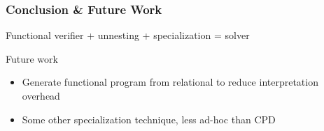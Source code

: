 \documentclass[xcolor=table]{beamer}
\begin{document}
\begin{frame}[fragile]
  \transwipe[direction=90]
  \frametitle{Conclusion \& Future Work}
\begin{center}
Functional verifier + unnesting + specialization = solver
\end{center}

\vspace{15pt}

Future work

\begin{itemize}
  \item Generate functional program from relational to reduce interpretation overhead
  \item Some other specialization technique, less ad-hoc than CPD

\end{itemize}
\end{frame}
\end{document}

